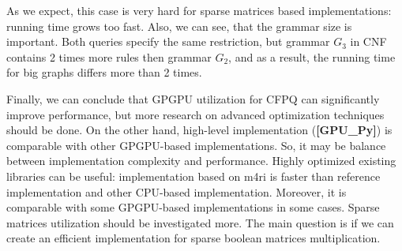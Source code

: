 As we expect, this case is very hard for sparse matrices based implementations: running time grows too fast.
Also, we can see, that the grammar size is important.
Both queries specify the same restriction, but grammar $G_3$ in CNF contains 2 times more rules then grammar $G_2$, and as a result, the running time for big graphs differs more than 2 times.

Finally, we can conclude that GPGPU utilization for CFPQ can significantly improve performance, but more research on advanced optimization techniques should be done.
On the other hand, high-level implementation (\textbf{[GPU\_Py]}) is comparable with other GPGPU-based implementations.
So, it may be balance between implementation complexity and performance.
Highly optimized existing libraries can be useful: implementation based on m4ri is faster than reference implementation and other CPU-based implementation.
Moreover, it is comparable with some GPGPU-based implementations in some cases.
Sparse matrices utilization should be investigated more.
The main question is if we can create an efficient implementation for sparse boolean matrices multiplication.
